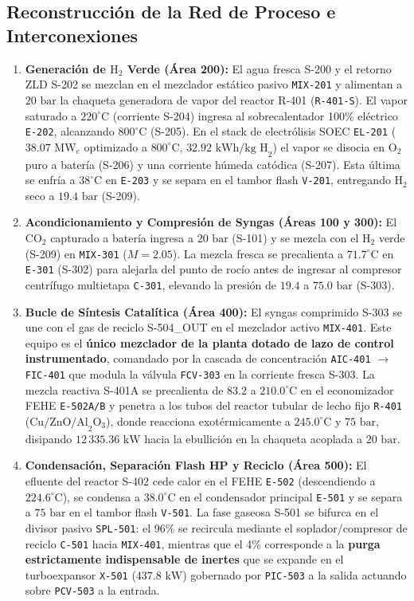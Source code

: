 \documentclass[10pt,letterpaper]{article}
\begin{document}
\subsection{Reconstrucción de la Red de Proceso e Interconexiones}
\begin{enumerate}[leftmargin=*]
    \item \textbf{Generación de $\text{H}_2$ Verde (Área 200):} El agua fresca S-200 y el retorno ZLD S-202 se mezclan en el mezclador estático pasivo \texttt{MIX-201} y alimentan a $20\text{ bar}$ la chaqueta generadora de vapor del reactor R-401 (\texttt{R-401-S}). El vapor saturado a $220^\circ\text{C}$ (corriente S-204) ingresa al sobrecalentador 100\% eléctrico \texttt{E-202}, alcanzando $800^\circ\text{C}$ (S-205). En el stack de electrólisis SOEC \texttt{EL-201} ($38.07\text{ MW}_e$ optimizado a $800^\circ\text{C}$, $32.92\text{ kWh/kg H}_2$) el vapor se disocia en $\text{O}_2$ puro a batería (S-206) y una corriente húmeda catódica (S-207). Esta última se enfría a $38^\circ\text{C}$ en \texttt{E-203} y se separa en el tambor flash \texttt{V-201}, entregando $\text{H}_2$ seco a $19.4\text{ bar}$ (S-209).
    \item \textbf{Acondicionamiento y Compresión de Syngas (Áreas 100 y 300):} El $\text{CO}_2$ capturado a batería ingresa a $20\text{ bar}$ (S-101) y se mezcla con el $\text{H}_2$ verde (S-209) en \texttt{MIX-301} ($M = 2.05$). La mezcla fresca se precalienta a $71.7^\circ\text{C}$ en \texttt{E-301} (S-302) para alejarla del punto de rocío antes de ingresar al compresor centrífugo multietapa \texttt{C-301}, elevando la presión de $19.4$ a $75.0\text{ bar}$ (S-303).
    \item \textbf{Bucle de Síntesis Catalítica (Área 400):} El syngas comprimido S-303 se une con el gas de reciclo S-504\_OUT en el mezclador activo \texttt{MIX-401}. Este equipo es el \textbf{único mezclador de la planta dotado de lazo de control instrumentado}, comandado por la cascada de concentración \texttt{AIC-401} $\to$ \texttt{FIC-401} que modula la válvula \texttt{FCV-303} en la corriente fresca S-303. La mezcla reactiva S-401A se precalienta de $83.2$ a $210.0^\circ\text{C}$ en el economizador FEHE \texttt{E-502A/B} y penetra a los tubos del reactor tubular de lecho fijo \texttt{R-401} ($\text{Cu/ZnO/Al}_2\text{O}_3$), donde reacciona exotérmicamente a $245.0^\circ\text{C}$ y $75\text{ bar}$, disipando $12\,335.36\text{ kW}$ hacia la ebullición en la chaqueta acoplada a $20\text{ bar}$.
    \item \textbf{Condensación, Separación Flash HP y Reciclo (Área 500):} El efluente del reactor S-402 cede calor en el FEHE \texttt{E-502} (descendiendo a $224.6^\circ\text{C}$), se condensa a $38.0^\circ\text{C}$ en el condensador principal \texttt{E-501} y se separa a $75\text{ bar}$ en el tambor flash \texttt{V-501}. La fase gaseosa S-501 se bifurca en el divisor pasivo \texttt{SPL-501}: el 96\% se recircula mediante el soplador/compresor de reciclo \texttt{C-501} hacia \texttt{MIX-401}, mientras que el 4\% corresponde a la \textbf{purga estrictamente indispensable de inertes} que se expande en el turboexpansor \texttt{X-501} ($437.8\text{ kW}$) gobernado por \texttt{PIC-503} a la salida actuando sobre \texttt{PCV-503} a la entrada.

\end{enumerate}
\end{document}
